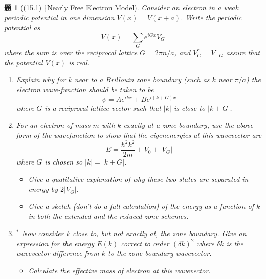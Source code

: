\documentclass[UTF8,10pt,a4paper]{article}
\theoremstyle{Problem}
\newtheorem{prob}{题}
\theoremstyle{Solution}
\providecommand{\abs}[1]{\left\lvert#1\right\rvert}
\begin{document}
\thispagestyle{FirstPageStyle}
\begin{prob}[(15.1) $\ddagger$Nearly Free Electron Model]
    Consider an electron in a weak periodic potential in one dimension $V(x)=V(x+a)$. Write the periodic potential as
    \[
        V(x)=\sum_Ge^{iGx}V_G
    \]
    where the sum is over the reciprocal lattice $G=2\pi n/a$, and $V_G^*=V_{-G}$ assure that the potential $V(x)$ is real.
    \begin{enumerate}
        \item[(a)] Explain why for $k$ near to a Brillouin zone boundary (such as $k$ near $\pi/a$) the electron wave-function should be taken to be
        \[
            \psi=Ae^{ikx}+Be^{i(k+G)x}\tag{15.14}
        \]
        where $G$ is a reciprocal lattice vector such that $\abs{k}$ is close to $\abs{k+G}$.
        \item[(b)] For an electron of mass $m$ with $k$ exactly at a zone boundary, use the above form of the wavefunction to show that the eigenenergies at this wavevector are
        \[
            E=\frac{\hbar^2k^2}{2m}+V_0\pm\abs{V_G}
        \]
        where $G$ is chosen so $\abs{k}=\abs{k+G}$.
        \begin{itemize}
            \item[$\triangleright$] Give a qualitative explanation of why these two states are separated in energy by $2\abs{V_G}$.
            \item[$\triangleright$] Give a sketch (don't do a full calculation) of the energy as a function of $k$ in both the extended and the reduced zone schemes.
        \end{itemize}
        \item[(c)] $^*$ Now consider $k$ close to, but not exactly at, the zone boundary. Give an expression for the energy $E(k)$ correct to order $(\delta k)^2$ where $\delta k$ is the wavevector difference from $k$ to the zone boundary wavevector.
        \begin{itemize}
            \item[$\triangleright$] Calculate the effective mass of electron at this wavevector.
        \end{itemize}
    \end{enumerate}
\end{prob}
\end{document}
